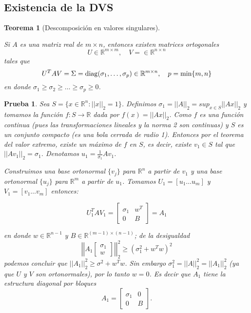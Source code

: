 \documentclass[12pt]{article}
\newtheorem{thm}{Teorema}
\newtheorem{prb}{Prueba}
\newcommand{\real}{\mathbb{R}}
\begin{document}
\subsection{Existencia de la DVS}

\begin{thm} [Descomposici\'on en valores singulares] \label{svd} 
 
 Si $A$ es una matriz real de $m \times n$, entonces existen matrices ortogonales
\[
   U \in \real^{m \times m}, \quad
   V = \in \real^{n \times n} 
\]
tales que 
\[
  U^TAV = \Sigma = {\rm diag}(\sigma_1, \ldots, \sigma_p) \in \real^{m \times n}, \quad   p = \min \{m,n\}
\]
en donde $\sigma_1 \ge \sigma_2 \ge \ldots \ge \sigma_p \ge 0$.
\end{thm}

\begin{prb}

\bigskip

Sea $S = \{ x \in \real^n : ||x||_2 = 1 \}$. Definimos $\sigma_1 = ||A||_2 = sup_{x \in S}||Ax||_2$ y tomamos la función $f:S\rightarrow \real$ dada por $f(x) = ||Ax||_2$. Como $f$ es una función continua (pues las transformaciones lineales y la norma 2 son continuas) y $S$ es un conjunto compacto (es una bola cerrada de radio 1). Entonces por el teorema del valor extremo, existe un máximo de $f$ en $S$, es decir, existe $v_1 \in S$ tal que $||Av_1||_2 = \sigma_1$. Denotamos $u_1 = \frac{1}{\sigma_1}Av_1$.

Construimos una base ortonormal $\{v_j\}$ para $\real^n$ a partir de $v_1$ y una base ortonormal $\{u_j\}$ para $\real^m$ a partir de $u_1$. Tomamos $U_1 = [u_1 \dots u_m]$ y $V_1 = [v_1 \dots v_m]$ entonces:

$$
U_1^TAV_1 = \left [ 
    \begin{array}{cc}  
    \sigma_1 & w^T \\
    0 & B  
    \end{array} 
    \right ] = A_1
$$

en donde $w \in \real^{n-1}$ y $B \in \real^{(m-1) \times (n-1)}$;
de la desigualdad 
\[
   \left |\left | A_1   \left [ \begin{array}{c} \sigma_1 \\ w \end{array} \right ] \right |\right|_2^2  \ge ( \sigma_1^2 + w^Tw )^2
\]
podemos concluir que $||A_1||_2^2 \ge  \sigma^2 + w^Tw$. Sin embargo $\sigma_1^2 = ||A||_2^2 = ||A_1||_2^2$ (ya que $U$ y $V$ son ortonormales), por lo tanto $w=0$. Es decir que $A_1$ tiene la estructura diagonal por bloques
\[
 A_1 = \left [ \begin{array}{cc}  \sigma_1 &    0 \\
                                         0   & B  
                   \end{array} 
       \right ].
\]


\end{prb}
\end{document}
